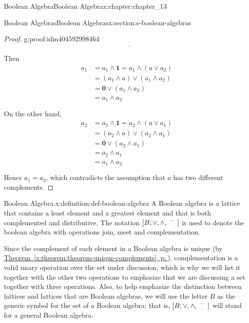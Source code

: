 \documentclass[twoside,10pt,]{book}
\newcommand{\xreffont}{\relax}
\numberwithin{equation}{section}
\begin{document}
\begin{chapterptx}{Boolean Algebra}{}{Boolean Algebra}{}{}{x:chapter:chapter_13}
\begin{sectionptx}{Boolean Algebras}{}{Boolean Algebras}{}{}{x:section:s-boolean-algebras}
\begin{proof}{}{g:proof:idm404592998464}
\begin{equation*}
\begin{array}{c}
\end{array}\text{.}
\end{equation*}
%
\par
Then%
\begin{equation*}
\begin{split}
a_1 & =a_1 \land \pmb{1} = a_1 \land  \left(a \lor  a_2\right)\\
&=\left(a_1 \land  a\right) \lor  \left(a_1 \land  a_2\right)\\
&=\pmb{0} \lor  \left(a_1 \land  a_2\right)\\
&=a_1 \land  a_2\\
\\
\end{split}
\end{equation*}
On the other hand,%
\begin{equation*}
\begin{split}
a_2 &= a_2 \land  \pmb{1} = a_2 \land  \left(a \lor  a_1\right)\\
&= \left(a_2 \land  a\right) \lor  \left(a_2 \land  a_1\right)\\
&=  \pmb{0} \lor  \left(a_2 \land  a_1\right)\\
&= a_2 \land  a_1\\
&= a_1 \land  a_2\\
\\
\end{split}
\end{equation*}
Hence \(a_1 = a_2\), which contradicts the assumption that \(a\) has two different complements.%
\end{proof}
\begin{definition}{Boolean Algebra.}{x:definition:def-boolean-algebra}%
%
\label{g:notation:idm404592992912}%
A Boolean algebra is a lattice that contains a least element and a greatest element and that is both complemented and distributive. The notation \([B;  \lor , \land, \bar{\hspace{5 mm}}]\) is used to denote the boolean algebra with operations join, meet and complementation.%
\end{definition}
Since the complement of each element in a Boolean algebra is unique (by \hyperref[x:theorem:theorem-unique-complements]{Theorem~{\xreffont\ref{x:theorem:theorem-unique-complements}}, p.\,\pageref{x:theorem:theorem-unique-complements}}), complementation is a valid unary operation over the set under discussion, which is why we will list it together with the other two operations to emphasize that we are discussing a set together with three operations. Also, to help emphasize the distinction between lattices and lattices that are Boolean algebras, we will use the letter \(B\) as the generic symbol for the set of a Boolean algebra; that is, \([B; \lor , \land, \bar{\hspace{5 mm}} ]\) will stand for a general Boolean algebra.%

\end{sectionptx}
\end{chapterptx}
\end{document}
